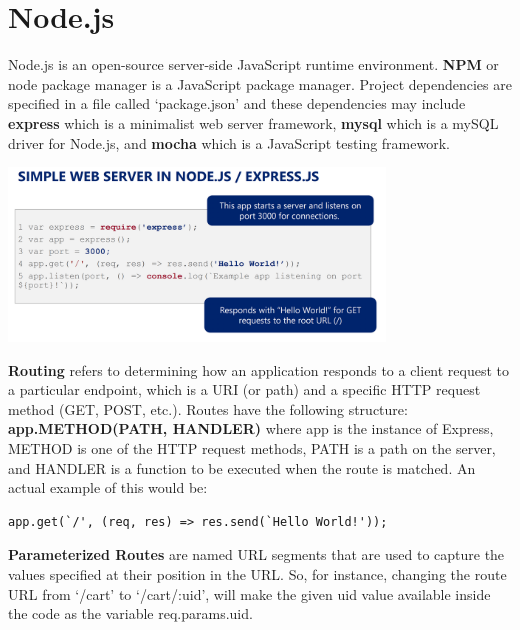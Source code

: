 \documentclass{article}
\begin{document}
\section*{Node.js} Node.js is an open-source server-side JavaScript runtime environment. \textbf{NPM} or node package manager is a JavaScript package manager. Project dependencies are specified in a file called `package.json' and these dependencies may include \textbf{express} which is a minimalist web server framework, \textbf{mysql} which is a mySQL driver for Node.js, and \textbf{mocha} which is a JavaScript testing framework.

\includegraphics[width=10cm]{webserver.png}

\textbf{Routing} refers to determining how an application responds to a client request to a particular endpoint, which is a URI (or path) and a specific HTTP request method (GET, POST, etc.). Routes have the following structure: \textbf{app.METHOD(PATH, HANDLER)} where app is the instance of Express, METHOD is one of the HTTP request methods, PATH is a path on the server, and HANDLER is a function to be executed when the route is matched. An actual example of this would be:

\begin{tcolorbox}
    \begin{verbatim}
app.get(`/', (req, res) => res.send(`Hello World!'));
    \end{verbatim}
\end{tcolorbox}

\textbf{Parameterized Routes} are named URL segments that are used to capture the values specified at their position in the URL. So, for instance, changing the route URL from `/cart' to `/cart/:uid', will make the given uid value available inside the code as the variable req.params.uid.
\end{document}
